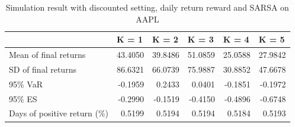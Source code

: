 \documentclass{article}
\begin{document}
\begin{table}[H]
\centering
\begin{tabular}{|l|r|r|r|r|r|} 
\hline
                             & \multicolumn{1}{l|}{K = 1} & \multicolumn{1}{l|}{K = 2} & \multicolumn{1}{l|}{K = 3} & \multicolumn{1}{l|}{K = 4} & \multicolumn{1}{l|}{K = 5}  \\ 
\hline
Mean of final returns        & 43.4050                    & 39.8486                    & 51.0859                    & 25.0588                    & 27.9842                     \\ 
\hline
SD of final returns          & 86.6321                    & 66.0739                    & 75.9887                    & 30.8852                    & 47.6678                     \\ 
\hline
95\% VaR                     & -0.1959                    & 0.2433                     & 0.0401                     & -0.1851                    & -0.1972                     \\ 
\hline
95\% ES                      & -0.2990                    & -0.1519                    & -0.4150                    & -0.4896                    & -0.6748                     \\ 
\hline
Days of positive return (\%) & 0.5199                     & 0.5194                     & 0.5194                     & 0.5184                     & 0.5193                      \\
\hline
\end{tabular}
\caption{Simulation result with discounted setting, daily return reward and SARSA on AAPL}
\label{table1}
\end{table}
\end{document}
